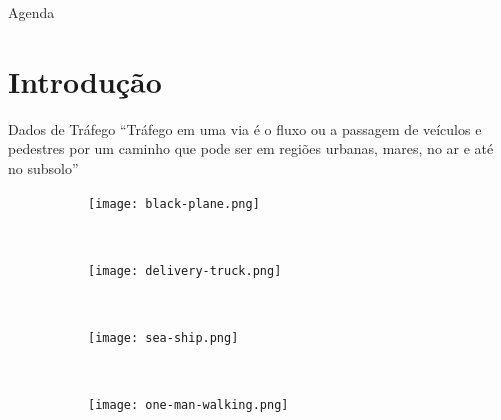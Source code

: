 

\customtitlepage

\showqrcode

\begin{frame}{Agenda}
  \overview
\end{frame}

\section{Introdução}

\begin{frame}{Dados de Tráfego}
  ``Tráfego em uma via é o fluxo ou a passagem de veículos e pedestres por um
caminho que pode ser em regiões urbanas, mares, no ar e até no subsolo''

\hfill \citep{Chen2015}

  \begin{figure}[h!]
    \centering
    \begin{subfigure}{0.20\textwidth}
      \centering
      \texttt{[image: black-plane.png]}
    \end{subfigure}
    ~
    \begin{subfigure}{0.20\textwidth}
      \centering
      \texttt{[image: delivery-truck.png]}
    \end{subfigure}
    ~
    \begin{subfigure}{0.20\textwidth}
      \centering
      \texttt{[image: sea-ship.png]}
    \end{subfigure}
    ~
    \begin{subfigure}{0.20\textwidth}
      \centering
      \texttt{[image: one-man-walking.png]}
    \end{subfigure}
  \end{figure}
\end{frame}

